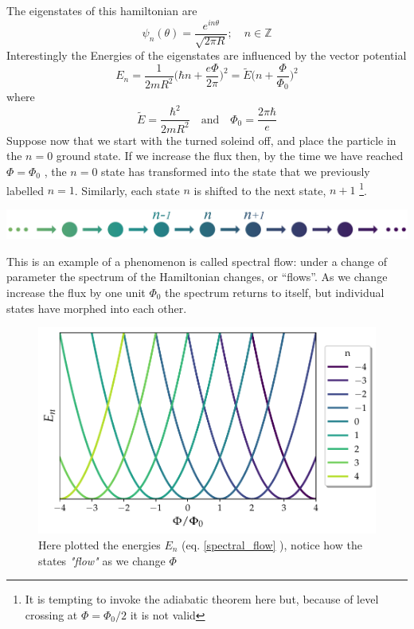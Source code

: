         The eigenstates of this hamiltonian are 
        \[
        \psi_n(\theta)=\frac {e^{in\theta}} {\sqrt{2\pi R}}; \quad n\in \mathbb Z
        \]
        Interestingly the Energies of the eigenstates are influenced by the vector potential
        \begin{equation} \label{spectral_flow}
                E_n=\frac 1{2mR^2}\bigg(\hbar n+ \frac{e\Phi}{2\pi}\bigg)^2=\tilde E\bigg(n+\frac{\Phi}{\Phi_0}\bigg)^2
        \end{equation}
        where
        \[
        \tilde E=\frac{\hbar^2}{2mR^2} \quad \textrm{and} \quad \Phi_0=\frac{2\pi \hbar}e
        \]
        Suppose now that we start with the turned soleind off, and place the particle in the $n=0$ ground
        state. If we increase the flux then, by the time we have reached $\Phi=\Phi_0$ , the $n=0$ state
        has transformed into the state that we previously labelled $n = 1$. Similarly, each state
        $n$ is shifted to the next state, $n + 1$ \footnote{It is tempting to invoke the adiabatic theorem
        here but, because of level crossing at $\Phi=\Phi_0/2$ it is not valid}.\\
        \begin{minipage}{\textwidth}
                    \includegraphics[width=1\linewidth]{Immagini/topo/flow.pdf}
        \end{minipage}
        This is an example of a phenomenon is called spectral flow: under a change of parameter
        the spectrum of the Hamiltonian changes, or “flows”. As we change increase the flux
        by one unit  $\Phi_0$ the spectrum returns to itself, but individual states have morphed into
        each other. \cite{tong2016lectures}
        \begin{figure}[h]
            \includegraphics[width=\linewidth]{Immagini/topo/spectral_flow.pdf}
            \caption{Here plotted the energies $E_n$ (eq. \ref{spectral_flow} ), notice how the states \textit{"flow"} as we change $\Phi$}
            \label{fig:spectral-flow}
        \end{figure}
